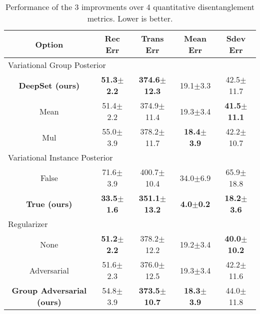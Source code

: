 \documentclass{article}
\begin{document}
\begin{table*}[t]
\caption{Performance of the 3 improvments over 4 quantitative disentanglement metrics. Lower is better.}
\label{sample-table}
\vskip 0.15in
\begin{center}
\begin{footnotesize}
\begin{tabular}{ccccc}
\toprule
Option & Rec Err & Trans Err & Mean Err & Sdev Err \\
\midrule\midrule
\multicolumn{5}{l}{Variational Group Posterior} \\
\midrule
\textbf{DeepSet (ours)} &\textbf{51.3$\pm$2.2} &\textbf{374.6$\pm$12.3} &19.1$\pm$3.3 &42.5$\pm$11.7 \\
Mean &51.4$\pm$2.2 &374.9$\pm$11.4 &19.3$\pm$3.4 &\textbf{41.5$\pm$11.1} \\
Mul &55.0$\pm$3.9 &378.2$\pm$11.7 &\textbf{18.4$\pm$3.9} &42.2$\pm$10.7 \\
\midrule\midrule
\multicolumn{5}{l}{Variational Instance Posterior} \\
\midrule
False    &71.6$\pm$3.9 	&400.7$\pm$10.4	&34.0$\pm$6.9	&65.9$\pm$18.8 \\
\textbf{True (ours)}  &\textbf{33.5$\pm$1.6}	&\textbf{351.1$\pm$13.2}	&\textbf{4.0$\pm$0.2}	&\textbf{18.2$\pm$3.6}\\
\midrule\midrule
\multicolumn{5}{l}{Regularizer} \\
\midrule
None &\textbf{51.2$\pm$2.2} &378.2$\pm$12.2 &19.2$\pm$3.4 &\textbf{40.0$\pm$10.2} \\
Adversarial &51.6$\pm$2.3 &376.0$\pm$12.5 &19.3$\pm$3.4 &42.2$\pm$11.6 \\
\textbf{Group Adversarial (ours)} &54.8$\pm$3.9 &\textbf{373.5$\pm$10.7} &\textbf{18.3$\pm$3.9} &44.0$\pm$11.8 \\
\bottomrule
\end{tabular}
\end{footnotesize}
\end{center}
\vskip -0.1in
\end{table*}





\appendix
\end{document}
